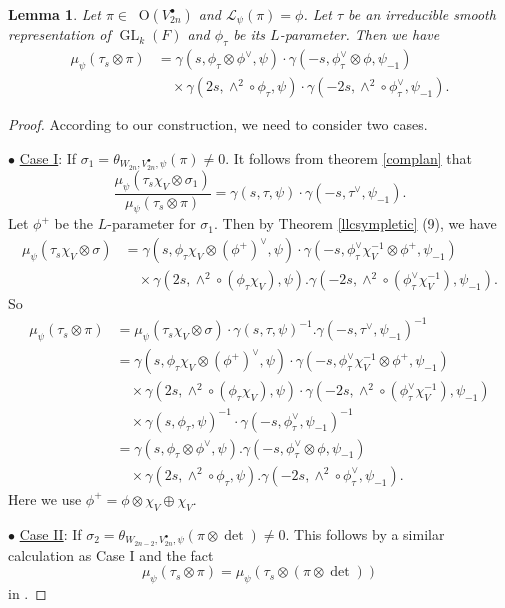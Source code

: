 \documentclass[article]{article}
\numberwithin{equation}{section}
\newtheorem{lemma}[theorem]{Lemma}
\theoremstyle{definition}
\DeclareMathOperator{\GL}{GL}
\DeclareMathOperator{\Irrt}{Irr_{temp}}
\begin{document}
\begin{lemma}\label{respectplancherel}
Let $\pi\in \Irrt \mathrm O(V^\bullet_{2n})$ and $\mathcal L_{\psi}(\pi)=\phi$. Let $\tau$ be an irreducible smooth representation of $\GL_k(F)$ and $\phi_{\tau}$ be its $L$-parameter. Then we have   
$$
\begin{aligned} \mu_{\psi}\left(\tau_{s} \otimes \pi\right) &=\gamma\left(s, \phi_{\tau} \otimes \phi^{\vee}, \psi\right) \cdot \gamma\left(-s, \phi_{\tau}^{\vee} \otimes \phi, \psi_{-1}\right) \\
 & \quad \times \gamma\left(2 s, \wedge^{2} \circ \phi_{\tau}, \psi\right) \cdot \gamma\left(-2 s, \wedge^{2} \circ \phi_{\tau}^{\vee}, \psi_{-1}\right) .\end{aligned}
$$
\end{lemma}
\begin{proof}
According to our construction, we need to consider two cases.  

$\bullet$ \underline{Case I}: If $\sigma_1=\theta_{W_{2n}, V^\bullet_{2n}, \psi}(\pi)\neq 0$. It follows from theorem \ref{complan} that 
$$
\frac{\mu_{\psi}(\tau_s\chi_{V}\otimes\sigma_1)}{\mu_{\psi}(\tau_s\otimes\pi)}=\gamma(s,\tau,\psi)\cdot \gamma(-s,\tau^{\vee},\psi_{-1}).
$$ 
Let $\phi^+$ be the $L$-parameter for $\sigma_1$. Then by Theorem \ref{llcsympletic} (9), we have 
\begin{align*}
\mu_{\psi}(\tau_s\chi_{V}\otimes \sigma)&=\gamma(s,\phi_{\tau}\chi_{V}\otimes (\phi^+)^ {\vee},\psi)\cdot \gamma(-s, \phi_{\tau}^{\vee} \chi_{V}^{-1}\otimes\phi^+, \psi_{-1} )\\
& \quad \times \gamma (2s, \wedge^2\circ (\phi_{\tau}\chi_{V}), \psi). \gamma(-2s, \wedge^{2} \circ (\phi_{\tau}^{\vee} \chi_{V}^{-1}),\psi_{-1}).
\end{align*}
So 
\begin{align*}
\mu_{\psi}(\tau_s\otimes \pi)&= \mu_{\psi}(\tau_s\chi_{V}\otimes \sigma)\cdot \gamma(s,\tau,\psi)^{-1}.\gamma(-s,
\tau^{\vee},\psi_{-1})^{-1}\\ 
&=\gamma(s,\phi_{\tau}\chi_{V} \otimes (\phi^+)^{\vee},\psi)\cdot \gamma(-s, \phi_{\tau}^{\vee}\chi_{V}^{-1} \otimes \phi^+, \psi_{-1} )\\
& \quad \times \gamma (2s, \wedge^2\circ (\phi_{\tau}\chi_{V}), \psi)\cdot  \gamma(-2s, \wedge^{2} \circ (\phi_{\tau}^{\vee} \chi_{V}^{-1}),\psi_{-1})\\
&\quad \times \gamma(s,\phi_{\tau},\psi)^{-1}\cdot \gamma(-s,
\phi_{\tau}^{\vee},\psi_{-1})^{-1} \\ 
&= \gamma(s,\phi_{\tau}\otimes\phi^{\vee},\psi).\gamma(-s, \phi_{\tau}^{\vee}\otimes \phi, \psi_{-1} )\\
& \quad \times \gamma (2s, \wedge^2\circ \phi_{\tau}, \psi). \gamma(-2s, \wedge^{2} \circ \phi_{\tau}^{\vee},\psi_{-1}).
\end{align*}
Here we use $\phi^+=\phi\otimes\chi_{V}\oplus\chi_{V}$. 

$\bullet$ \underline{Case II}: If $\sigma_2=\theta_{W_{2n-2}, V^\bullet_{2n}, \psi}(\pi\otimes \det)\neq 0 $. This follows by a similar calculation as Case I and the fact 
$$\mu_{\psi}(\tau_s \otimes \pi)= \mu_{\psi}(\tau_s \otimes (\pi\otimes \det))$$
in \cite[Lemma B.1]{MR3166215}. 
\end{proof}
\end{document}
